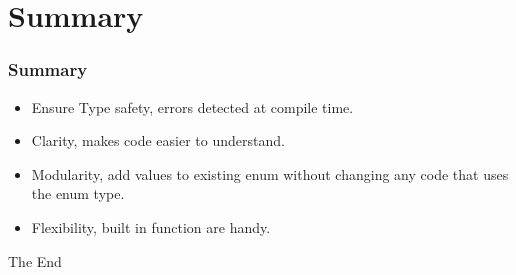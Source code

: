 \documentclass{beamer}
\begin{document}
\section{Summary}
\begin{frame}
\frametitle{Summary}
\begin{itemize}
\item Ensure {\color{green} Type safety}, errors detected at compile time.
\item {\color{red} Clarity}, makes code easier to understand.
\item {\color{orange} Modularity}, add values to existing enum without changing any code that uses the enum type.
\item {\color{purple} Flexibility}, built in function are handy.
\end{itemize}
\end{frame}
\begin{frame}
\Huge{\centerline{The End}}
\end{frame}
\end{document}
